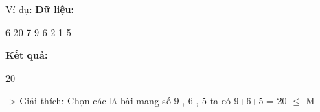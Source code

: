 Ví dụ:
\textbf{Dữ liệu: }

6 20 7 9 6 2 1 5

\textbf{Kết quả: }

20

-> Giải thích: Chọn các lá bài mang số 9 , 6 , 5 ta có 9+6+5 = 20  $\le$  M